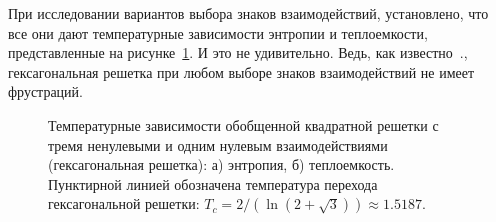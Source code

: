 \documentclass[utf8,12pt]{jetp}
\begin{document}
При исследовании вариантов выбора знаков взаимодействий, установлено, что все они дают температурные зависимости энтропии и теплоемкости, представленные на рисунке~\ref{Hex}. И это не удивительно. Ведь, как известно~\cite{houtapell1950}., гексагональная решетка при любом выборе знаков взаимодействий не имеет фрустраций.

\begin{figure}[h]
	\begin{minipage}[h]{0.5\linewidth}
	\end{minipage}
	\hfill
	\begin{minipage}[h]{0.5\linewidth}
	\end{minipage}
	\caption{Температурные зависимости обобщенной квадратной решетки с тремя ненулевыми и одним нулевым взаимодействиями (гексагональная решетка): а) энтропия, б) теплоемкость. Пунктирной линией обозначена температура перехода гексагональной решетки: $T_c = 2/(\ln(2+\sqrt{3}))\approx 1.5187$.}
	\label{Hex}
\end{figure}
\end{document}
